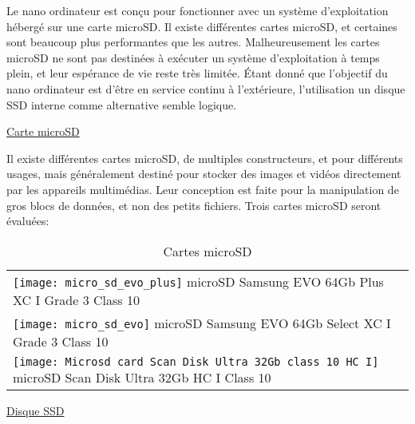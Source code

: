 \par Le nano ordinateur est conçu pour fonctionner avec un système d'exploitation hébergé sur une carte microSD. Il existe différentes cartes microSD, et certaines sont  beaucoup plus performantes que les autres. Malheureusement les cartes microSD ne sont pas destinées à exécuter un système d'exploitation à temps plein, et leur espérance de vie reste très limitée.  Étant donné que l'objectif du nano ordinateur est d'être en service continu à l'extérieure, l'utilisation un disque SSD interne comme alternative semble logique.
\par\underline{Carte microSD}
\par Il existe différentes cartes microSD, de multiples constructeurs, et pour différents usages, mais généralement destiné pour stocker des images et vidéos directement par les appareils multimédias. Leur conception est faite pour la manipulation de gros blocs de données, et non des petits fichiers. Trois cartes microSD 
seront évaluées:
{
    \renewcommand*{\arraystretch}{1.4}
    \begin{table}[ht]
    \centering
    \caption{Cartes microSD}\label{table:cartes_microSD}
    \vspace{0.1em} %
    \begin{tabular}{l}
        \texttt{[image: micro\_sd\_evo\_plus]} microSD Samsung EVO 64Gb Plus XC I Grade 3 Class 10\\
        \texttt{[image: micro\_sd\_evo]} microSD Samsung EVO 64Gb Select XC I Grade 3 Class 10\\
        \texttt{[image: Microsd card Scan Disk Ultra 32Gb class 10 HC I]} microSD Scan Disk Ultra 32Gb HC I Class 10\\
    \end{tabular}
    \end{table}
}
{\color{red}}
\par\underline{Disque SSD}
